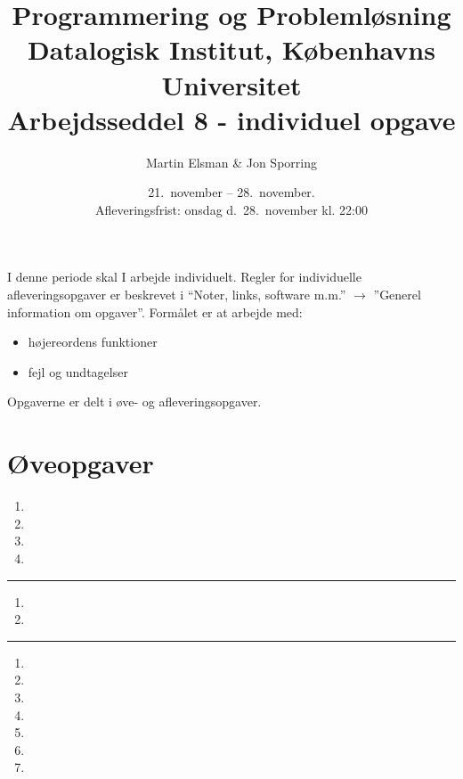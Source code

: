 \documentclass[a4paper,12pt]{article}
\title{Programmering og Problemløsning\\Datalogisk Institut,
  Københavns Universitet\\Arbejdsseddel 8 - individuel opgave}
\author{Martin Elsman \& Jon Sporring}
\date{21.\ november -- 28.\ november.\\Afleveringsfrist: onsdag d.\ 28.\ november kl. 22:00}
\begin{document}
\maketitle

\noindent
I denne periode skal I arbejde individuelt. Regler for individuelle afleveringsopgaver er beskrevet i ``Noter, links, software m.m.'' $\rightarrow$ ''Generel information om opgaver''. Formålet er at arbejde med:
\begin{itemize}
\item højereordens funktioner
\item fejl og undtagelser
\end{itemize}

Opgaverne er delt i øve- og afleveringsopgaver.

\section*{Øveopgaver}

\begin{enumerate}[label=8ø.\arabic*,start=0]
\item 
\item 
\item 
\item 
\end{enumerate}

\begin{center}
\rule{0.5\linewidth}{0.4pt}
\end{center}


\begin{enumerate}[label=8ø.\arabic*,start=4]
\item 
\item 
\end{enumerate}

\begin{center}
\rule{0.5\linewidth}{0.4pt}
\end{center}


\begin{enumerate}[label=8ø.\arabic*,start=6]
\item 
\item 
\item 
\item 
\item 
\item 
\item 
\end{enumerate}
\end{document}

